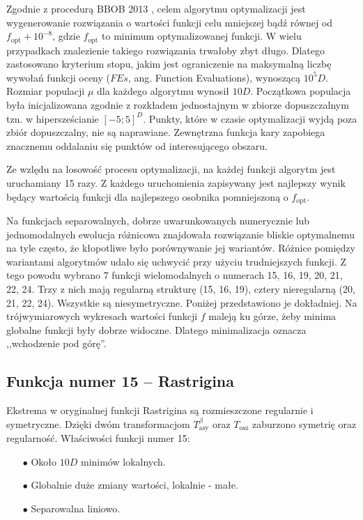 \documentclass[a4paper,onecolumn,oneside,12pt,wide,floatssmall]{mwrep}
\theoremstyle{definition}
\theoremstyle{plain}%
\theoremstyle{remark}
\begin{document}
Zgodnie z procedurą BBOB 2013 \cite{setup}, 
celem algorytmu optymalizacji jest wygenerowanie rozwiązania o wartości funkcji celu mniejszej bądź 
równej od $f_\text{opt} + 10^{-8}$, gdzie $f_\text{opt}$ to minimum optymalizowanej funkcji. 
W wielu przypadkach znalezienie takiego rozwiązania trwałoby zbyt długo.
Dlatego zastosowano kryterium stopu,
jakim jest ograniczenie na maksymalną liczbę wywołań funkcji oceny ($FEs$, ang. Function Evaluations), wynoszącą $10^5D$. 
Rozmiar populacji $\mu$ dla każdego algorytmu wynosił $10D$. 
Początkowa populacja była inicjalizowana zgodnie z rozkładem jednostajnym w zbiorze dopuszczalnym tzn.
w hipersześcianie $[-5; 5]^D$. Punkty, które w czasie optymalizacji wyjdą poza zbiór 
dopuszczalny, nie są naprawiane. Zewnętrzna funkcja kary
zapobiega znacznemu oddalaniu się punktów od interesującego obszaru.

Ze wzlędu na losowość procesu optymalizacji, na każdej funkcji algorytm jest uruchamiany 15 razy.
Z każdego uruchomienia zapisywany jest najlepszy wynik będący wartością funkcji dla najlepszego osobnika
pomniejszoną o $f_\text{opt}$.

Na funkcjach separowalnych, dobrze uwarunkowanych numerycznie lub jednomodalnych ewolucja różnicowa znajdowała rozwiązanie
bliskie optymalnemu na tyle często, że kłopotliwe było porównywanie jej wariantów. 
Różnice pomiędzy wariantami algorytmów udało się uchwycić przy użyciu trudniejszych funkcji.
Z tego powodu wybrano 7 funkcji 
wielomodalnych o numerach 15, 16, 19, 20, 21, 22, 24. Trzy z nich mają regularną strukturę (15, 16, 19), 
cztery nieregularną (20, 21, 22, 24). Wszystkie są niesymetryczne.
Poniżej przedstawiono je dokładniej.
Na trójwymiarowych wykresach wartości funkcji $f$ maleją ku górze, 
żeby minima globalne funkcji były dobrze widoczne.
Dlatego minimalizacja oznacza ,,wchodzenie pod górę''.

\subsection{Funkcja numer 15 -- Rastrigina}

Ekstrema w oryginalnej funkcji Rastrigina są rozmieszczone regularnie i symetryczne. Dzięki dwóm transformacjom $T^\beta_\text{asy}$ 
oraz $T_\text{osz}$ zaburzono symetrię oraz regularność. Właściwości funkcji numer 15: 
\begin{itemize}
 \item[$\bullet$] Około $10D$ minimów lokalnych.
 \item[$\bullet$] Globalnie duże zmiany wartości, lokalnie - małe.
 \item[$\bullet$] Separowalna liniowo.
\end{itemize} 
\end{document}
